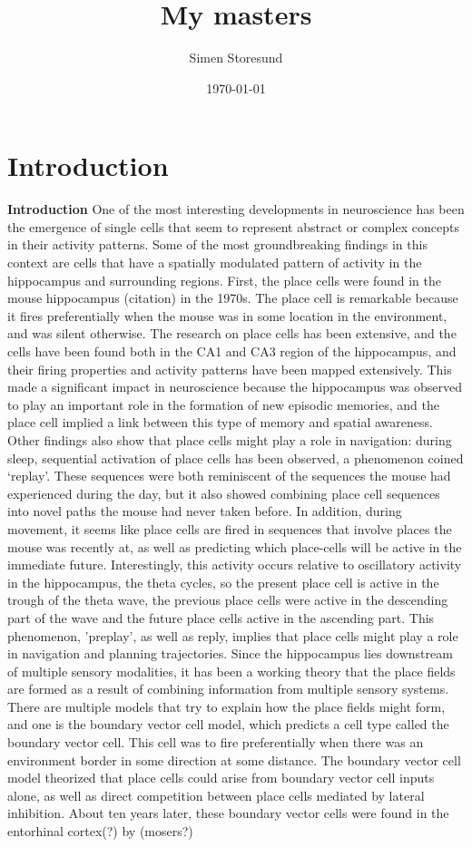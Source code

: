 \documentclass{article}
\title{My masters}
\author{Simen Storesund}
\date{\today}
\begin{document}
    \maketitle
    \section{Introduction}
    \textbf{Introduction} One of the most interesting developments in neuroscience has been the emergence of single cells that seem to represent abstract or complex concepts in their activity patterns. Some of the most groundbreaking findings in this context are cells that have a spatially modulated pattern of activity in the hippocampus and surrounding regions. First, the place cells were found in the mouse hippocampus (citation) in the 1970s. The place cell is remarkable because it fires preferentially when the mouse was in some location in the environment, and was silent otherwise. The research on place cells has been extensive, and the cells have been found both in the CA1 and CA3 region of the hippocampus, and their firing properties and activity patterns have been mapped extensively.
    This made a significant impact in neuroscience because the hippocampus was observed to play an important role in the formation of new episodic memories, and the place cell implied a link between this type of memory and spatial awareness.
    Other findings also show that place cells might play a role in navigation: during sleep, sequential activation of place cells has been observed, a phenomenon coined ‘replay'. These sequences were both reminiscent of the sequences the mouse had experienced during the day, but it also showed combining place cell sequences into novel paths the mouse had never taken before.
    In addition, during movement, it seems like place cells are fired in sequences that involve places the mouse was recently at, as well as predicting which place-cells will be active in the immediate future. Interestingly, this activity occurs relative to oscillatory activity in the hippocampus, the theta cycles, so the present place cell is active in the trough of the theta wave, the previous place cells were active in the descending part of the wave and the future place cells active in the ascending part. This phenomenon, 'preplay', as well as reply, implies that place cells might play a role in navigation and planning trajectories.
    Since the hippocampus lies downstream of multiple sensory modalities, it has been a working theory that the place fields are formed as a result of combining information from multiple sensory systems. There are multiple models that try to explain how the place fields might form, and one is the boundary vector cell model, which predicts a cell type called the boundary vector cell. This cell was to fire preferentially when there was an environment border in some direction at some distance. The boundary vector cell model theorized that place cells could arise from boundary vector cell inputs alone, as well as direct competition between place cells mediated by lateral inhibition. About ten years later, these boundary vector cells were found in the entorhinal cortex(?) by (mosers?)
\end{document}
